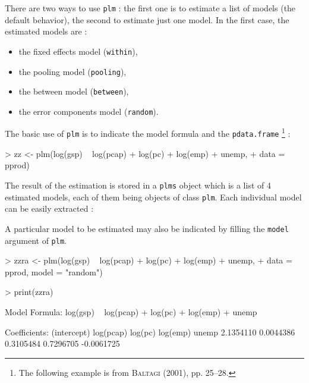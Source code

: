 \documentclass{article}
\begin{document}
There are two ways to use \texttt{plm} : the first one is to estimate
a list of models (the default behavior), the second to estimate just one model.
In the first case, the estimated models are :

\begin{itemize}
\item the fixed effects model (\texttt{within}),
\item the pooling model (\texttt{pooling}),
\item the between model (\texttt{between}),
\item the error components model (\texttt{random}).
\end{itemize}

The basic use of \texttt{plm} is to indicate the model formula and the \texttt{pdata.frame}
\footnote{The following example is from \textsc{Baltagi} (2001), pp. 25--28.} :

\begin{Schunk}
\begin{Sinput}
> zz <- plm(log(gsp) ~ log(pcap) + log(pc) + log(emp) + unemp, 
+     data = pprod)
\end{Sinput}
\end{Schunk}

The result of the estimation is stored in a \texttt{plms} object which
is a list of 4 estimated models, each of them being objects of class \texttt{plm}.
Each individual model can be easily extracted :

\begin{Schunk}
\end{Schunk}

A particular model to be estimated may also be indicated by filling
the \texttt{model} argument of \texttt{plm}.

\begin{Schunk}
\begin{Sinput}
> zzra <- plm(log(gsp) ~ log(pcap) + log(pc) + log(emp) + unemp, 
+     data = pprod, model = "random")
\end{Sinput}
\end{Schunk}


\begin{Schunk}
\begin{Sinput}
> print(zzra)
\end{Sinput}
\begin{Soutput}
Model Formula: log(gsp) ~ log(pcap) + log(pc) + log(emp) + unemp

Coefficients:
(intercept)   log(pcap)     log(pc)    log(emp)       unemp 
  2.1354110   0.0044386   0.3105484   0.7296705  -0.0061725 
\end{Soutput}
\end{Schunk}
\end{document}
